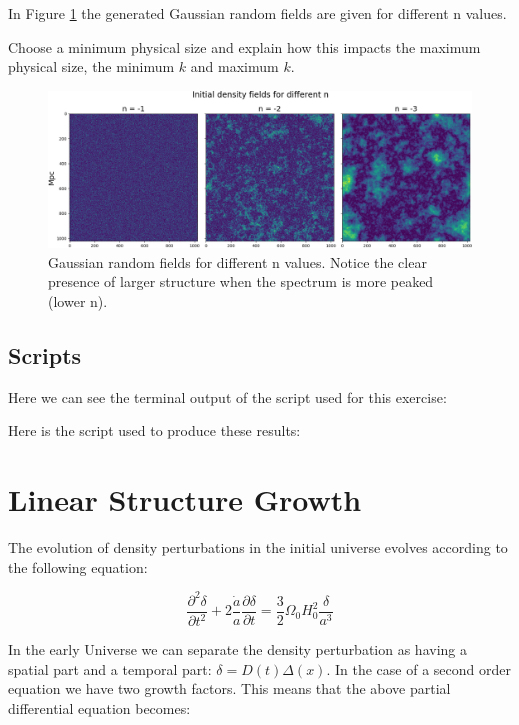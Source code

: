 \documentclass[a4paper,10pt]{article}
\begin{document}
In Figure \ref{fig:2} the generated Gaussian random fields are given for different n values. 

\color{red}
Choose a minimum physical size and explain how this impacts the maximum physical size, the minimum $k$ and maximum $k$. 

\color{black}

\begin{figure}[h!]
  \centering
  \includegraphics[width=0.8\linewidth]{./plots/2.png}
  \caption{Gaussian random fields for different n values. Notice the clear presence of larger structure when the spectrum is more peaked (lower n).}
  \label{fig:2}
\end{figure}

\subsection{Scripts}

Here we can see the terminal output of the script used for this exercise:


Here is the script used to produce these results: 


\section{Linear Structure Growth}

The evolution of density perturbations in the initial universe evolves according to the following equation: 

\begin{equation}
\frac{\partial^2\delta}{\partial t^2} + 2\frac{\dot{a}}{a}\frac{\partial\delta}{\partial t} = \frac{3}{2}\Omega_0H_0^2\frac{\delta}{a^3}
\end{equation}

In the early Universe we can separate the density perturbation as having a spatial part and a temporal part: $\delta = D(t)\Delta(x)$. In the case of a second order equation we have two growth factors. This means that the above partial differential equation becomes: 
\end{document}
